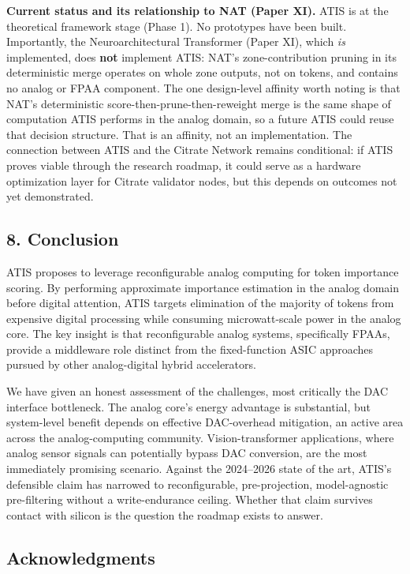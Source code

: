\textbf{Current status and its relationship to NAT (Paper XI).} ATIS is
at the theoretical framework stage (Phase 1). No prototypes have been
built. Importantly, the Neuroarchitectural Transformer (Paper XI), which
\emph{is} implemented, does \textbf{not} implement ATIS: NAT's
zone-contribution pruning in its deterministic merge operates on whole
zone outputs, not on tokens, and contains no analog or FPAA component.
The one design-level affinity worth noting is that NAT's deterministic
score-then-prune-then-reweight merge is the same shape of computation
ATIS performs in the analog domain, so a future ATIS could reuse that
decision structure. That is an affinity, not an implementation. The
connection between ATIS and the Citrate Network remains conditional: if
ATIS proves viable through the research roadmap, it could serve as a
hardware optimization layer for Citrate validator nodes, but this
depends on outcomes not yet demonstrated.

\subsection{8. Conclusion}\label{conclusion}

ATIS proposes to leverage reconfigurable analog computing for token
importance scoring. By performing approximate importance estimation in
the analog domain before digital attention, ATIS targets elimination of
the majority of tokens from expensive digital processing while consuming
microwatt-scale power in the analog core. The key insight is that
reconfigurable analog systems, specifically FPAAs, provide a middleware
role distinct from the fixed-function ASIC approaches pursued by other
analog-digital hybrid accelerators.

We have given an honest assessment of the challenges, most critically
the DAC interface bottleneck. The analog core's energy advantage is
substantial, but system-level benefit depends on effective DAC-overhead
mitigation, an active area across the analog-computing community.
Vision-transformer applications, where analog sensor signals can
potentially bypass DAC conversion, are the most immediately promising
scenario. Against the 2024--2026 state of the art, ATIS's defensible
claim has narrowed to reconfigurable, pre-projection, model-agnostic
pre-filtering without a write-endurance ceiling. Whether that claim
survives contact with silicon is the question the roadmap exists to
answer.

\subsection{Acknowledgments}\label{acknowledgments}


